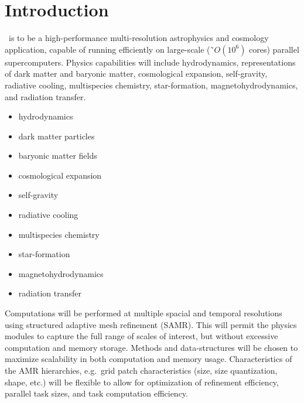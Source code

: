 \documentclass{book}
\begin{document}

\chapter{Introduction} \label{s:intro}




   \cello\ is to be a high-performance multi-resolution astrophysics
   and cosmology application, capable of running efficiently on
   large-scale (\~{\ }$O(10^6)$ cores) parallel supercomputers.
   Physics capabilities will include hydrodynamics, representations of
   dark matter and baryonic matter, cosmological expansion,
   self-gravity, radiative cooling, multispecies chemistry,
   star-formation, magnetohydrodynamics, and radiation transfer.

\begin{itemize}
\item[\todo] hydrodynamics
\item[\todo] dark matter particles
\item[\todo] baryonic matter fields
\item[\todo] cosmological expansion
\item[\todo] self-gravity
\item[\todo] radiative cooling
\item[\todo] multispecies chemistry
\item[\todo] star-formation
\item[\todo] magnetohydrodynamics
\item[\todo] radiation transfer
\end{itemize}

   Computations will be performed at multiple spacial and temporal
   resolutions using structured adaptive mesh refinement (SAMR).  This
   will permit the physics modules to capture the full range of scales
   of interest, but without excessive computation and memory storage.
   Methods and data-structures will be chosen to maximize scalability
   in both computation and memory usage.  Characteristics of the AMR
   hierarchies, e.g.~grid patch characteristics (size, size
   quantization, shape, etc.) will be flexible to allow for
   optimization of refinement efficiency, parallel task sizes,
   and task computation efficiency.
   
\end{document}
